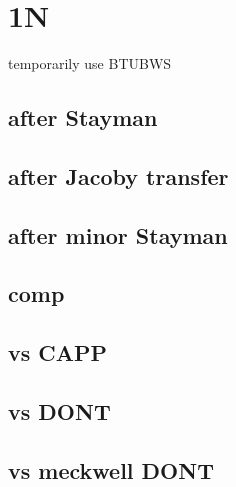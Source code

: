 \section{1N}

temporarily use BTUBWS


\subsection{after Stayman}


\subsection{after Jacoby transfer}


\subsection{after minor Stayman}


\subsection{comp}


\subsection{vs CAPP}


\subsection{vs DONT}

\subsection{vs meckwell DONT}

